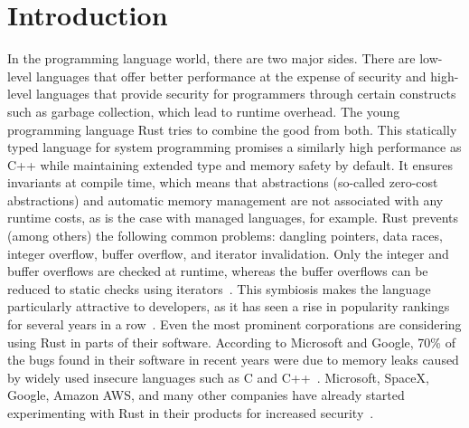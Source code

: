 \documentclass{article}
\begin{document}

\section{Introduction}
In the programming language world, there are two major sides. There are low-level languages that offer better performance at the expense of security and high-level languages that provide security for programmers through certain constructs such as garbage collection, which lead to runtime overhead. The young programming language Rust tries to combine the good from both. This statically typed language for system programming promises a similarly high performance as C++ while maintaining extended type and memory safety by default. It ensures invariants at compile time, which means that abstractions (so-called zero-cost abstractions) and automatic memory management are not associated with any runtime costs, as is the case with managed languages, for example. Rust prevents (among others) the following common problems: dangling pointers, data races, integer overflow, buffer overflow, and iterator invalidation. Only the integer and buffer overflows are checked at runtime, whereas the buffer overflows can be reduced to static checks using iterators~\cite{Anderson2016}. This symbiosis makes the language particularly attractive to developers, as it has seen a rise in popularity rankings for several years in a row~\cite{StackOverflow2020}. Even the most prominent corporations are considering using Rust in parts of their software. According to Microsoft and Google, 70\% of the bugs found in their software in recent years were due to memory leaks caused by widely used insecure languages such as C and C++~\cite{Microsoft2019MemoryBugs, RustInAndroid}. Microsoft, SpaceX, Google, Amazon AWS, and many other companies have already started experimenting with Rust in their products for increased security~\cite{MicrosoftJoinsRust, AmazonLovesRust, RustInAndroid, GoogleRustFoundation}.
\end{document}
